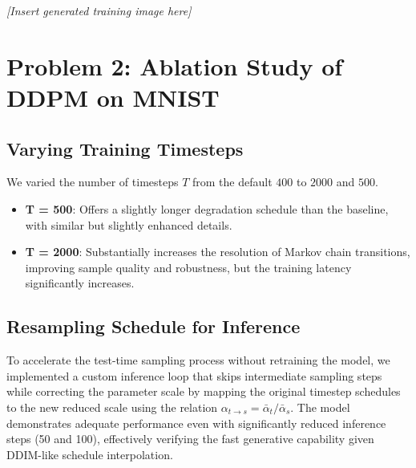 \documentclass[11pt]{article}
\begin{document}
\vspace{0.5cm}
\centerline{\textit{[Insert generated training image here]}}
\vspace{0.5cm}

\newpage
\section*{Problem 2: Ablation Study of DDPM on MNIST}

\subsection*{Varying Training Timesteps}
We varied the number of timesteps $T$ from the default $400$ to $2000$ and $500$.
\begin{itemize}
    \item \textbf{T = 500}: Offers a slightly longer degradation schedule than the baseline, with similar but slightly enhanced details.
    \item \textbf{T = 2000}: Substantially increases the resolution of Markov chain transitions, improving sample quality and robustness, but the training latency significantly increases.
\end{itemize}

\subsection*{Resampling Schedule for Inference}
To accelerate the test-time sampling process without retraining the model, we implemented a custom inference loop that skips intermediate sampling steps while correcting the parameter scale by mapping the original timestep schedules to the new reduced scale using the relation $\alpha_{t \to s} = \bar{\alpha}_t / \bar{\alpha}_s$. 
The model demonstrates adequate performance even with significantly reduced inference steps (50 and 100), effectively verifying the fast generative capability given DDIM-like schedule interpolation.
\end{document}

